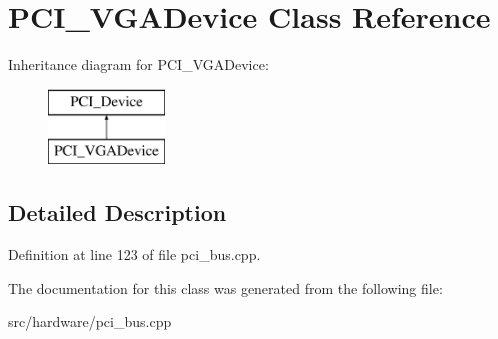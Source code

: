 \hypertarget{classPCI__VGADevice}{\section{P\-C\-I\-\_\-\-V\-G\-A\-Device Class Reference}
\label{classPCI__VGADevice}
}
Inheritance diagram for P\-C\-I\-\_\-\-V\-G\-A\-Device\-:\begin{figure}[H]
\begin{center}
\leavevmode
\includegraphics[height=2.000000cm]{classPCI__VGADevice}
\end{center}
\end{figure}


\subsection{Detailed Description}


Definition at line 123 of file pci\-\_\-bus.\-cpp.



The documentation for this class was generated from the following file\-:\begin{DoxyCompactItemize}
\item 
src/hardware/pci\-\_\-bus.\-cpp\end{DoxyCompactItemize}
